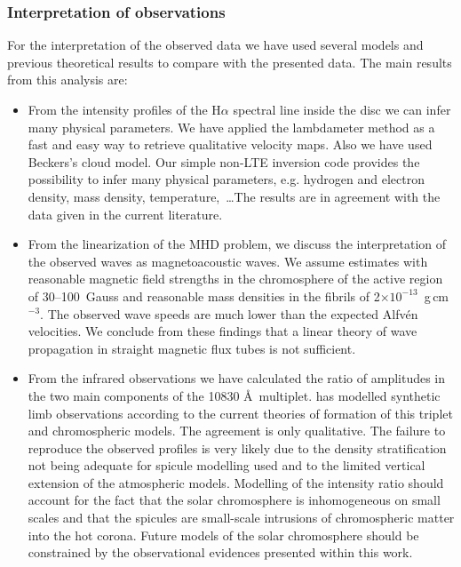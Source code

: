 \subsubsection*{Interpretation of observations}

For the interpretation of the observed data we have used several models and previous theoretical results to compare with the presented data. The main results from this analysis are:
\begin{itemize}
\item From the intensity profiles of the H$\alpha$ spectral line inside the disc we can infer many physical parameters. We have applied the lambdameter method as a fast and easy way to retrieve qualitative velocity maps. Also we have used Beckers's \citeyear{1964PhDT........83B} cloud model. Our simple non-LTE inversion code provides the possibility to infer many physical parameters, e.g. hydrogen and electron density, mass density, temperature,~\dots The results are in agreement with the data given in the current literature.

\item From the linearization of the MHD problem, we discuss the interpretation of the observed waves as magnetoacoustic waves.  We assume estimates with reasonable magnetic field strengths  in the chromosphere of the active region of 30--100~Gauss and reasonable mass densities in the fibrils of 2$\times10^{-13}$~g\,cm$^{-3}$. The observed wave speeds are much lower than the expected Alfv\'en velocities. We conclude from these findings that a linear theory of wave propagation in straight magnetic flux tubes is not sufficient. 


\item From the infrared observations we have calculated the ratio of amplitudes in the two main components of the  10830 \AA\, multiplet. \cite{Centeno06} has modelled synthetic limb observations according to the current theories of formation of this triplet and chromospheric models. The agreement is only qualitative. The failure to reproduce the observed profiles is very likely due to the density stratification not being adequate for spicule modelling used %
and to the limited vertical extension of the atmospheric models. Modelling of the intensity ratio should account for the fact that the solar chromosphere is inhomogeneous on small scales and that the spicules are small-scale intrusions of chromospheric matter into the hot corona. Future models of the solar chromosphere should be constrained by the observational evidences presented within this work.

\end{itemize}

